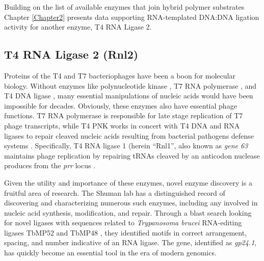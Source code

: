 Building on the list of available enzymes that join hybrid polymer substrates Chapter \ref{Chapter2} presents data supporting RNA-templated DNA:DNA ligation activity for another enzyme, T4 RNA Ligase 2.

\subsection{T4 RNA Ligase 2 (Rnl2)}

Proteins of the T4 and T7 bacteriophages have been a boon for molecular biology. Without enzymes like polynucleotide kinase \citep{Richardson1965a}, T7 RNA polymerase \citep{Summers1970b}, and T4 DNA ligase \citep{Weiss1967a}, many essential manipulations of nucleic acids would have been impossible for decades. Obviously, these enzymes also have essential phage functions. T7 RNA polymerase is responsible for late stage replication of T7 phage transcripts, while T4 PNK works in concert with T4 DNA and RNA ligases to repair cleaved	nucleic acids resulting from bacterial pathogens defense systems \citep{Wang2002b}. Specifically, T4 RNA ligase 1 (herein ``Rnl1'', also known as \textit{gene 63} maintains phage replication by repairing tRNAs cleaved by an anticodon nuclease produces from the \textit{prr} locus \citep{Amitsur1987d}.

Given the utility and importance of these enzymes, novel enzyme discovery is a fruitful area of research. The Shuman lab has a distinguished record of discovering and characterizing numerous such enzymes, including any involved in nucleic acid synthesis, modification, and repair. Through a blast search looking for novel ligases with sequences related to \textit{Trypanosoma brucei} RNA-editing ligases TbMP52 and TbMP48 \citep{Ho2002b}, they identified motifs in correct arrangement, spacing, and number indicative of an RNA ligase. The gene, identified as \textit{gp24.1}, has quickly become an essential tool in the era of modern genomics.

